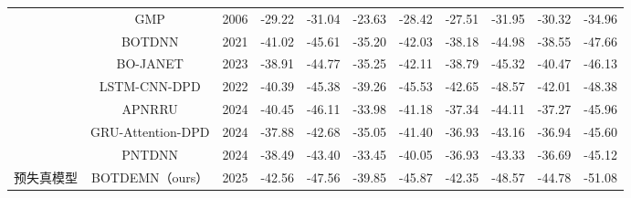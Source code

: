 \begin{table}[]
\begin{tabular}{c|c|c|cc|cc|cc|cc}
                          & GMP                  & 2006                 & -29.22                         & -31.04                         & -23.63                         & -28.42                         & -27.51                         & -31.95                         & -30.32                         & -34.96                         \\
                          & BOTDNN               & 2021                 & \cellcolor[HTML]{FFC000}-41.02 & \cellcolor[HTML]{FFFF00}-45.61 & -35.20                         & -42.03                         & -38.18                         & -44.98                         & -38.55                         & -47.66                         \\
                          & BO-JANET             & 2023                 & -38.91                         & -44.77                         & -35.25                         & -42.11                         & -38.79                         & -45.32                         & -40.47                         & -46.13                         \\
                          & LSTM-CNN-DPD         & 2022                 & -40.39                         & -45.38                         & -39.26                         & \cellcolor[HTML]{FFFF00}-45.53 & \cellcolor[HTML]{FF0000}-42.65 & \cellcolor[HTML]{FF0000}-48.57 & \cellcolor[HTML]{FFFF00}-42.01 & \cellcolor[HTML]{FFC000}-48.38 \\
                          & APNRRU               & 2024                 & \cellcolor[HTML]{FFFF00}-40.45 & \cellcolor[HTML]{FFC000}-46.11 & -33.98                         & -41.18                         & -37.34                         & -44.11                         & -37.27                         & -45.96                         \\
                          & GRU-Attention-DPD    & 2024                 & -37.88                         & -42.68                         & -35.05                         & -41.40                         & -36.93                         & -43.16                         & -36.94                         & -45.60                         \\
                          & PNTDNN               & 2024                 & -38.49                         & -43.40                         & -33.45                         & -40.05                         & -36.93                         & -43.33                         & -36.69                         & -45.12                         \\
\multirow{-9}{*}{预失真模型}   & BOTDEMN（ours）        & 2025                 & \cellcolor[HTML]{FF0000}-42.56 & \cellcolor[HTML]{FF0000}-47.56 & \cellcolor[HTML]{FF0000}-39.85 & \cellcolor[HTML]{FF0000}-45.87 & \cellcolor[HTML]{FFC000}-42.35 & \cellcolor[HTML]{FFC000}-48.57 & \cellcolor[HTML]{FF0000}-44.78 & \cellcolor[HTML]{FF0000}-51.08 \\ \hline
\end{tabular}
\end{table}
